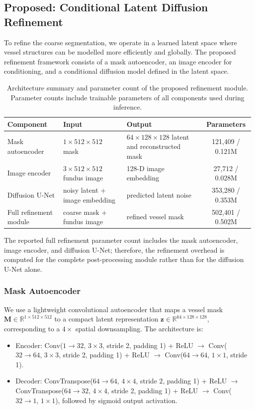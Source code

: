\documentclass[journal,article,submit,pdftex,moreauthors]{Definitions/mdpi}
\begin{document}
\subsection{Proposed: Conditional Latent Diffusion Refinement}

To refine the coarse segmentation, we operate in a learned latent space where vessel structures can be modelled more efficiently and globally. The proposed refinement framework consists of a mask autoencoder, an image encoder for conditioning, and a conditional diffusion model defined in the latent space.
\begin{table}[H]
\centering
\caption{Architecture summary and parameter count of the proposed refinement module. Parameter counts include trainable parameters of all components used during inference.}
\label{tab:architecture_params}
\small
\begin{tabularx}{\textwidth}{lX X c}
\toprule
Component & Input & Output & Parameters \\
\midrule
Mask autoencoder 
& $1\times512\times512$ mask 
& $64\times128\times128$ latent and reconstructed mask 
& 121,409 / 0.121M \\

Image encoder 
& $3\times512\times512$ fundus image 
& 128-D image embedding 
& 27,712 / 0.028M \\

Diffusion U-Net 
& noisy latent + image embedding 
& predicted latent noise 
& 353,280 / 0.353M \\

\midrule
Full refinement module 
& coarse mask + fundus image 
& refined vessel mask 
& 502,401 / 0.502M \\
\bottomrule
\end{tabularx}
\end{table}
The reported full refinement parameter count includes the mask autoencoder, image encoder, and diffusion U-Net; therefore, the refinement overhead is computed for the complete post-processing module rather than for the diffusion U-Net alone.

\subsubsection{Mask Autoencoder}

We use a lightweight convolutional autoencoder that maps a vessel mask $\mathbf{M}\in\mathbb{R}^{1\times512\times512}$ to a compact latent representation $\mathbf{z}\in\mathbb{R}^{64\times128\times128}$, corresponding to a $4\times$ spatial downsampling. The architecture is:
\begin{itemize}
  \item Encoder: Conv($1\rightarrow32$, $3\times3$, stride 2, padding 1) + ReLU $\rightarrow$ Conv($32\rightarrow64$, $3\times3$, stride 2, padding 1) + ReLU $\rightarrow$ Conv($64\rightarrow64$, $1\times1$, stride 1).
  \item Decoder: ConvTranspose($64\rightarrow64$, $4\times4$, stride 2, padding 1) + ReLU $\rightarrow$ ConvTranspose($64\rightarrow32$, $4\times4$, stride 2, padding 1) + ReLU $\rightarrow$ Conv($32\rightarrow1$, $1\times1$), followed by sigmoid output activation.
\end{itemize}
\end{document}
